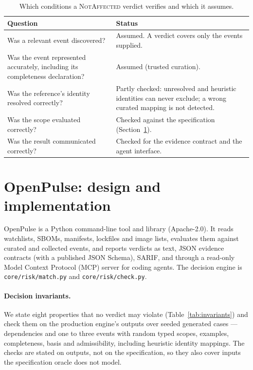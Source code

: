 \documentclass[11pt]{article}
\newcommand{\code}[1]{\texttt{#1}}
\begin{document}
\begin{table}[t]
\centering\small
\caption{Which conditions a \textsc{NotAffected} verdict verifies and which it
assumes.}
\label{tab:premises}
\begin{tabularx}{\linewidth}{lX}
\toprule
Question & Status \\
\midrule
Was a relevant event discovered? & Assumed. A verdict covers only the events supplied. \\
Was the event represented accurately, including its completeness declaration? & Assumed (trusted curation). \\
Was the reference's identity resolved correctly? & Partly checked: unresolved and heuristic identities can never exclude; a wrong curated mapping is not detected. \\
Was the scope evaluated correctly? & Checked against the specification (Section~\ref{sec:impl}). \\
Was the result communicated correctly? & Checked for the evidence contract and the agent interface. \\
\bottomrule
\end{tabularx}
\end{table}

\section{OpenPulse: design and implementation}
\label{sec:impl}

OpenPulse is a Python command-line tool and library (Apache-2.0). It reads
watchlists, SBOMs, manifests, lockfiles and image lists, evaluates them against
curated and collected events, and reports verdicts as text, JSON evidence
contracts (with a published JSON Schema), SARIF, and through a read-only Model
Context Protocol (MCP) server for coding agents. The decision engine is
\code{core/risk/match.py} and \code{core/risk/check.py}.

\paragraph{Decision invariants.} We state eight properties that no verdict may
violate (Table~\ref{tab:invariants}) and check them on the production engine's
outputs over seeded generated cases --- dependencies and one to three events
with random typed scopes, examples, completeness, basis and admissibility,
including heuristic identity mappings. The checks are stated on outputs, not on
the specification, so they also cover inputs the specification oracle does not
model.
\end{document}

